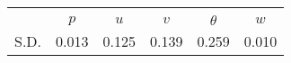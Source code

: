 \begin{tabular}{l*{1}{ccccc}}
\toprule
                &\multicolumn{5}{c}{}                             \\
                &$  p$&$ u $&$ v $&$ \theta $&$ w $\\
\midrule
S.D.              &    0.013&    0.125&    0.139&    0.259&    0.010\\
\bottomrule
\end{tabular}
